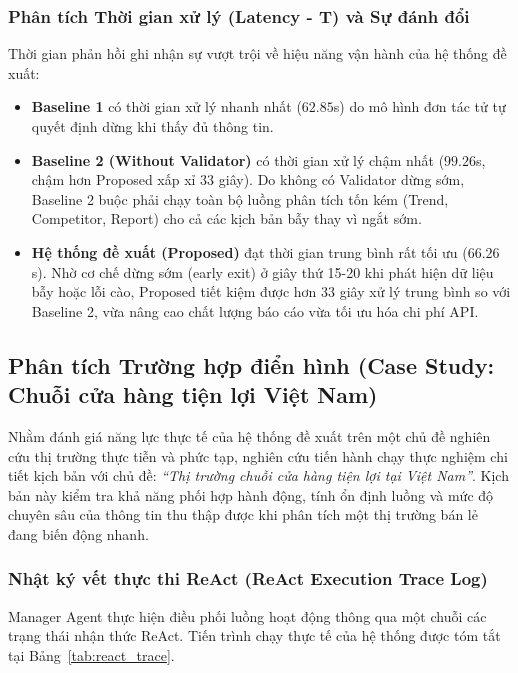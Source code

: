 \documentclass[11pt,a4paper]{article}
\begin{document}
\begin{itemize}
\subsubsection{Phân tích Thời gian xử lý (Latency - T) và Sự đánh đổi}
Thời gian phản hồi ghi nhận sự vượt trội về hiệu năng vận hành của hệ thống đề xuất:
\begin{itemize}
    \item \textbf{Baseline 1} có thời gian xử lý nhanh nhất ($62.85$s) do mô hình đơn tác tử tự quyết định dừng khi thấy đủ thông tin.
    \item \textbf{Baseline 2 (Without Validator)} có thời gian xử lý chậm nhất ($99.26$s, chậm hơn Proposed xấp xỉ 33 giây). Do không có Validator dừng sớm, Baseline 2 buộc phải chạy toàn bộ luồng phân tích tốn kém (Trend, Competitor, Report) cho cả các kịch bản bẫy thay vì ngắt sớm.
    \item \textbf{Hệ thống đề xuất (Proposed)} đạt thời gian trung bình rất tối ưu ($66.26$s). Nhờ cơ chế dừng sớm (early exit) ở giây thứ 15-20 khi phát hiện dữ liệu bẫy hoặc lỗi cào, Proposed tiết kiệm được hơn 33 giây xử lý trung bình so với Baseline 2, vừa nâng cao chất lượng báo cáo vừa tối ưu hóa chi phí API.
\end{itemize}

\subsection{Phân tích Trường hợp điển hình (Case Study: Chuỗi cửa hàng tiện lợi Việt Nam)}
Nhằm đánh giá năng lực thực tế của hệ thống đề xuất trên một chủ đề nghiên cứu thị trường thực tiễn và phức tạp, nghiên cứu tiến hành chạy thực nghiệm chi tiết kịch bản với chủ đề: \textit{``Thị trường chuỗi cửa hàng tiện lợi tại Việt Nam''}. Kịch bản này kiểm tra khả năng phối hợp hành động, tính ổn định luồng và mức độ chuyên sâu của thông tin thu thập được khi phân tích một thị trường bán lẻ đang biến động nhanh.

\subsubsection{Nhật ký vết thực thi ReAct (ReAct Execution Trace Log)}
Manager Agent thực hiện điều phối luồng hoạt động thông qua một chuỗi các trạng thái nhận thức ReAct. Tiến trình chạy thực tế của hệ thống được tóm tắt tại Bảng~\ref{tab:react_trace}.


\end{itemize}
\end{document}

